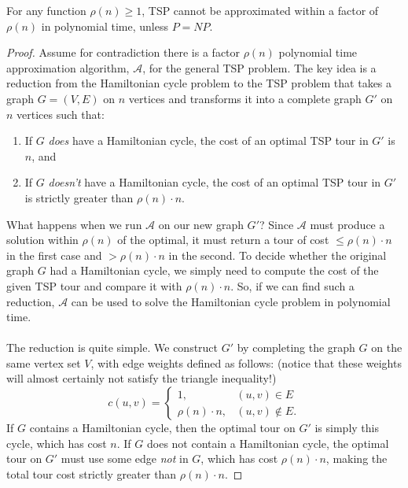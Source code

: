 \documentclass{article}
\newenvironment{theorem}[2][Theorem]{\begin{trivlist}
\item[\hskip \labelsep {\bfseries #1}\hskip \labelsep {\bfseries #2.}]}{\end{trivlist}}
\begin{document}
\begin{theorem}{3.5}{}
    For any function $\rho(n) \geq 1$, TSP cannot be approximated within a factor of $\rho(n)$ in polynomial time, unless $P = NP$.

    \begin{proof}
        Assume for contradiction there is a factor $\rho(n)$ polynomial time approximation algorithm, $\mathcal{A}$, for the general TSP problem. The key idea is a reduction from the Hamiltonian cycle problem to the TSP problem that takes a graph $G = (V,E)$ on $n$ vertices and transforms it into a complete graph $G'$ on $n$ vertices such that:\vspace{3pt}
        \begin{enumerate}
            \item[(1)] If $G$ \textit{does} have a Hamiltonian cycle, the cost of an optimal TSP tour in $G'$ is $n$, and \vspace{3pt}
            \item[(2)] If $G$ \textit{doesn't} have a Hamiltonian cycle, the cost of an optimal TSP tour in $G'$ is strictly greater than $\rho(n) \cdot n$. \vspace{2pt}
        \end{enumerate}
        What happens when we run $\mathcal{A}$ on our new graph $G'$? Since $\mathcal{A}$ must produce a solution within $\rho(n)$ of the optimal, it must return a tour of cost $\leq \rho(n) \cdot n$ in the first case and $> \rho(n) \cdot n$ in the second. To decide whether the original graph $G$ had a Hamiltonian cycle, we simply need to compute the cost of the given TSP tour and compare it with $\rho(n) \cdot n$. So, if we can find such a reduction, $\mathcal{A}$ can be used to solve the Hamiltonian cycle problem in polynomial time.\\
        \\
        The reduction is quite simple. We construct $G'$ by completing the graph $G$ on the same vertex set $V$, with edge weights defined as follows: (notice that these weights will almost certainly not satisfy the triangle inequality!)
        \[
        c(u,v) =
        \begin{cases}
            1, &(u,v) \in E\\
            \rho(n) \cdot n, &(u,v) \notin E.
        \end{cases}
        \]
        If $G$ contains a Hamiltonian cycle, then the optimal tour on $G'$ is simply this cycle, which has cost $n$. If $G$ does not contain a Hamiltonian cycle, the optimal tour on $G'$ must use some edge \textit{not} in $G$, which has cost $\rho(n) \cdot n$, making the total tour cost strictly greater than $\rho(n) \cdot n$.
    \end{proof}
\end{theorem}
\end{document}
